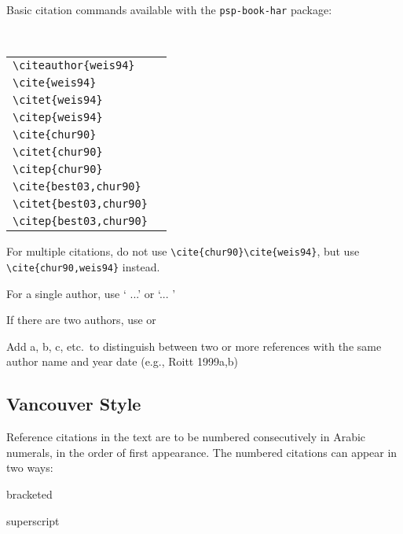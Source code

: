 Basic citation commands available with the \verb|psp-book-har|
package:

\

{\tablefont
\begin{tabular}{l@{\quad$\Rightarrow$\quad}l}
\verb|\citeauthor{weis94}|  & \citeauthor{weis94}\\
\verb|\cite{weis94}|  & \cite{weis94}\\
\verb|\citet{weis94}| & \citet{weis94}\\
\verb|\citep{weis94}| & \citep{weis94}\\
\verb|\cite{chur90}| & \cite{chur90}\\
\verb|\citet{chur90}| & \citet{chur90}\\
\verb|\citep{chur90}| & \citep{chur90}\\
\verb|\cite{best03,chur90}| & \cite{best03,chur90}\\
\verb|\citet{best03,chur90}| & \citet{best03,chur90}\\
\verb|\citep{best03,chur90}| & \citep{best03,chur90}\\
\end{tabular}}

\begin{itemlist}
\item For multiple citations, do not use \verb|\cite{chur90}\cite{weis94}|, but use
\verb|\cite{chur90,weis94}| instead.
\item For a single author, use `\citet{weis94} ...' or
`... \cite{weis94}'
\item If there are two authors, use \cite{chur90} or \citep{chur90}
\item Add a, b, c, etc.~to distinguish between two or
more references with the same author name and year date (e.g., Roitt
1999a,b)
\end{itemlist}

\subsection{Vancouver Style}

Reference citations in the text are to be numbered consecutively in
Arabic numerals, in the order of first appearance. The numbered citations
can appear in two ways:

\begin{romanlist}[(ii)]
\item bracketed
\item superscript
\end{romanlist}


